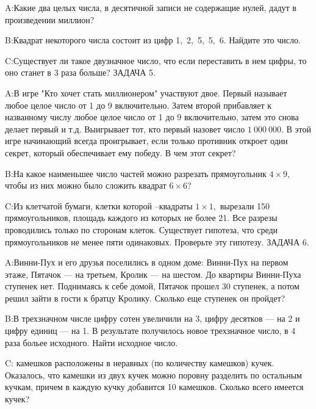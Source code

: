 \documentclass[10pt]{scrbook} \usepackage{modules/nonstahp_book}
\begin{document}
A:\qquad  Какие два целых числа, в десятичной записи не содержащие нулей, дадут в произведении миллион?

B:\qquad Квадрат некоторого числа состоит из цифр 1,\ 2,\ 5,\ 5,\ 6. Найдите это число.

C:\qquad Существует ли такое двузначное число, что если переставить в нем цифры, то оно станет в 3 раза больше?
\medbreak
\noindent
ЗАДАЧА 5.

A:\qquad В игре "Кто хочет стать миллионером" участвуют двое. Первый называет любое целое число от 1 до 9 включительно. Затем второй прибавляет к названному числу любое целое число от 1 до 9 включительно, затем это снова делает первый и т.д. Выигрывает тот, кто первый назовет число $1\ 000\ 000.$ В этой игре начинающий  всегда проигрывает, если только противник откроет один секрет, который обеспечивает ему победу. В чем этот секрет?

B:\qquad На какое наименьшее число частей можно разрезать прямоугольник $4\times 9,$ чтобы из них можно было сложить квадрат $6\times 6$? 

C:\qquad Из клетчатой бумаги, клетки которой --квадраты $1\times 1,$ вырезали 150 прямоугольников, площадь каждого из которых не более 21. Все разрезы проводились только по сторонам клеток. Существует гипотеза, что среди прямоугольников не менее пяти одинаковых. Проверьте эту гипотезу.
\medbreak
\noindent
ЗАДАЧА 6.

A:\qquad Винни-Пух и его друзья поселились в одном доме: Винни-Пух на первом этаже, Пятачок --- на третьем, Кролик --- на шестом. До квартиры Винни-Пуха ступенек нет. Поднимаясь к себе домой, Пятачок прошел 30 ступенек, а потом решил зайти в гости к братцу Кролику. Сколько еще ступенек он пройдет?

B:\qquad В трехзначном числе цифру сотен увеличили на 3, цифру десятков — на 2 и цифру единиц — на 1. В результате получилось новое трехзначное число, в 4 раза больее исходного. Найти исходное число. 

C: камешков расположены в неравных (по количеству камешков) кучек. Оказалось, что камешки из двух кучек можно поровну разделить по остальным кучкам, причем в каждую кучку добавится 10 камешков. Сколько всего имеется кучек?
\end{document}

